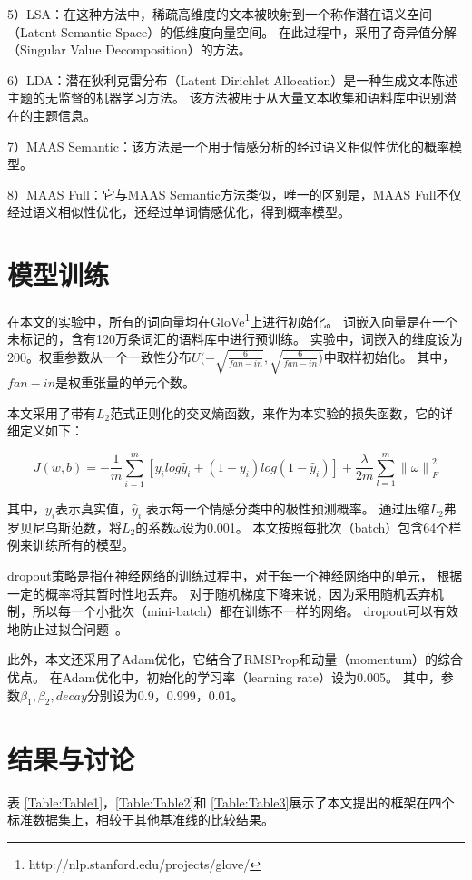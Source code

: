 5）LSA：在这种方法中，稀疏高维度的文本被映射到一个称作潜在语义空间（Latent Semantic Space）的低维度向量空间。
    在此过程中，采用了奇异值分解（Singular Value Decomposition）的方法。

6）LDA：潜在狄利克雷分布（Latent Dirichlet Allocation）是一种生成文本陈述主题的无监督的机器学习方法。
    该方法被用于从大量文本收集和语料库中识别潜在的主题信息。

7）MAAS Semantic：该方法是一个用于情感分析的经过语义相似性优化的概率模型。

8）MAAS Full：它与MAAS Semantic方法类似，唯一的区别是，MAAS Full不仅经过语义相似性优化，还经过单词情感优化，得到概率模型。

\section{模型训练}
在本文的实验中，所有的词向量均在GloVe\footnote{http://nlp.stanford.edu/projects/glove/}上进行初始化。
词嵌入向量是在一个未标记的，含有120万条词汇的语料库中进行预训练。
实验中，词嵌入的维度设为200。权重参数从一个一致性分布${U(-\sqrt{\frac{6}{fan-in}},\sqrt{\frac{6}{fan-in})}}$中取样初始化。
其中，${fan-in}$是权重张量的单元个数。

本文采用了带有${L_{2}}$范式正则化的交叉熵函数，来作为本实验的损失函数，它的详细定义如下：

\begin{equation}
J\left(w,b\right)=-\frac{1}{m}\sum_{i=1}^{m}\left[y_{i}log\hat{y}_{i}+\left(1-y_{i} \right)log\left ( 1-\widehat{y}_{i} \right )\right] + \frac{\lambda }{2m}\sum_{l=1}^{m}\left\|\omega \right\|_{F}^{2}
\end{equation}

其中，${y_{i}}$表示真实值，${\hat{y}_{i}}$ 表示每一个情感分类中的极性预测概率。
通过压缩${L_{2}}$弗罗贝尼乌斯范数，将${L_{2}}$的系数${\omega}$设为0.001。
本文按照每批次（batch）包含64个样例来训练所有的模型。

dropout策略是指在神经网络的训练过程中，对于每一个神经网络中的单元，
根据一定的概率将其暂时性地丢弃。
对于随机梯度下降来说，因为采用随机丢弃机制，所以每一个小批次（mini-batch）都在训练不一样的网络。
dropout可以有效地防止过拟合问题~。

此外，本文还采用了Adam优化，它结合了RMSProp和动量（momentum）的综合优点。
在Adam优化中，初始化的学习率（learning rate）设为0.005。
其中，参数${\beta_{1}, \beta_{2}, decay}$分别设为0.9，0.999，0.01。

\section{结果与讨论}
表 \ref{Table:Table1}，\ref{Table:Table2}和 \ref{Table:Table3}展示了本文提出的框架在四个标准数据集上，相较于其他基准线的比较结果。

